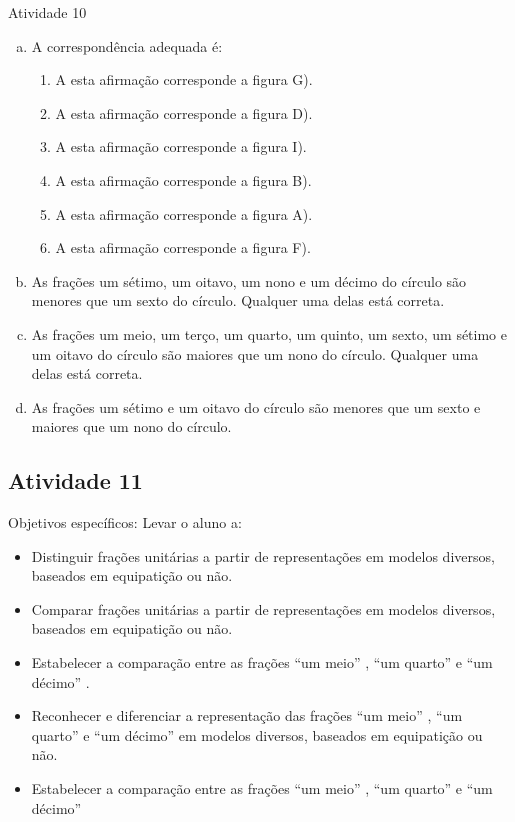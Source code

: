 \documentclass[oneside]{book}
\begin{document}
\begin{multicols}{2}
\begin{resposta*}{Atividade 10}
\begin{enumerate}[a),wide,labelindent=0pt] %
    \item       A correspondência adequada é:
\begin{enumerate} [\;\; I), labelindent=0pt] %
        \item           A esta afirmação corresponde a figura G).
        \item           A esta afirmação corresponde a figura D).
        \item           A esta afirmação corresponde a figura I).
        \item           A esta afirmação corresponde a figura B).
        \item           A esta afirmação corresponde a figura A).
        \item           A esta afirmação corresponde a figura F).
\end{enumerate} %

    \item       As frações um sétimo, um oitavo, um nono e um décimo do círculo são menores que um sexto do círculo. Qualquer uma delas está correta.
    \item       As frações um meio, um terço, um quarto, um quinto, um sexto, um sétimo e um oitavo do círculo são maiores que um nono do círculo. Qualquer uma delas está correta.
    \item       As frações um sétimo e um oitavo do círculo são menores que um sexto e maiores que um nono do círculo.
\end{enumerate} %
\end{resposta*}




\subsection{Atividade 11}

  Objetivos específicos: Levar o aluno a:
\begin{itemize} %
    \item       Distinguir frações unitárias a partir de representações em modelos diversos, baseados em equipatição ou não.
    \item       Comparar frações unitárias a partir de representações em modelos diversos, baseados em equipatição ou não.
    \item       Estabelecer a comparação entre as frações       ``um meio''      ,       ``um quarto''       e       ``um décimo''      .
    \item       Reconhecer e diferenciar a representação das frações       ``um meio''      ,       ``um quarto''       e       ``um décimo''       em modelos diversos, baseados em equipatição ou não.
    \item       Estabelecer a comparação entre as frações       ``um meio''      ,       ``um quarto''       e       ``um décimo''
\end{itemize} %



\end{multicols}
\end{document}
